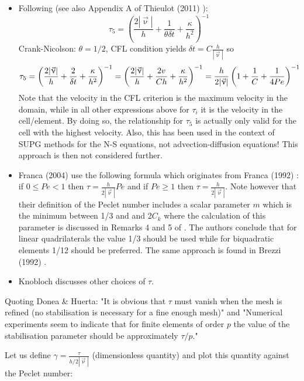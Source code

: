 \begin{itemize}
\item Following \cite{teos00} (see also Appendix A of Thieulot (2011) \cite{thie11}):
\[
\tau_5 = \left( \frac{2 |\vec{\upnu}|}{h} + \frac{1}{\theta \delta t} + \frac{\kappa}{h^2} \right)^{-1}  
\]
Crank-Nicolson: $\theta=1/2$, CFL condition yields $\delta t = C \frac{h}{|\vec\upnu|}$ so 
\[
\tau_5 = \left( \frac{2 |\vec{\upnu}|}{h} + \frac{2}{\delta t}+  \frac{\kappa}{h^2}  \right)^{-1}  
= \left( \frac{2 |\vec{\upnu}|}{h} + \frac{2 v}{C h} +  \frac{\kappa}{h^2}  \right)^{-1}  
= \frac{h}{2 |\vec{\upnu}|}  \left( 1 + \frac{1}{C} + \frac{1}{4 Pe} \right)^{-1} \nonumber 
\]
Note that the velocity in the CFL criterion is the maximum velocity in the domain, while 
in all other expressions above for $\tau_i$ it is the velocity in the cell/element. 
By doing so, the relationship  for $\tau_5$ is actually only valid for the cell with the 
highest velocity. 
Also, this has been used in the context of SUPG methods for the N-S equations, not advection-diffusion
equations! This approach is then not considered further.

\item Franca \etal (2004) \cite{frhm04} use the following formula which originates from 
Franca \etal (1992) \cite{frfh92}: if $0\le Pe < 1$ then
$\tau = \frac{h}{2 |\vec\upnu|} Pe$ and if $Pe \ge 1$ then $\tau = \frac{h}{2 |\vec\upnu|}$.
Note however that their definition of the Peclet number includes a scalar parameter $m$ which is 
the minimum between 1/3 and and 2$C_k$ where the calculation of this parameter is discussed in 
Remarks 4 and 5 of \cite{frfh92}. The authors conclude that for linear quadrilaterals the value
1/3 should be used while for biquadratic elements 1/12 should be preferred.
The same approach is found in Brezzi \etal (1992) \cite{brbf92}. 

\item Knobloch \cite{knob08} discusses other choices of $\tau$.

\end{itemize}

Quoting Donea \& Huerta: "It is obvious that $\tau$ must vanish when the mesh is refined (no stabilisation
is necessary for a fine enough mesh)" and "Numerical experiments seem to indicate that for 
finite elements of order $p$ the value of the stabilisation parameter should be approximately 
$\tau/p$."

Let us define $\gamma=\frac{\tau}{h/2|\vec\upnu|}$ (dimensionless quantity) and 
plot this quantity against the Peclet number:

